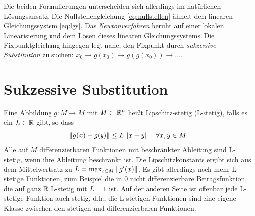 Die beiden Formulierungen unterscheiden sich allerdings im natürlichen
Lösungsansatz. Die Nullstellengleichung \eqref{eq:nullstellen} ähnelt
dem linearen Gleichungssystem \eqref{eq:lgs}. Das
\emph{Newtonverfahren} beruht auf einer lokalen Linearisierung und dem
Lösen dieses linearen Gleichungssystems. Die Fixpunktgleichung
hingegen legt nahe, den Fixpunkt durch \emph{sukzessive Substitution}
zu suchen: $x_0\to g(x_0)\to g(g(x_0))\to\ldots$.

\section{Sukzessive Substitution}

Eine Abbildung $g:M\to M$ mit $M\subset\mathbb{R}^n$ heißt Lipschitz-stetig
(L-stetig), falls es ein $L\in\mathbb{R}$ gibt, so dass
\begin{equation}
  \left\lVert{g(x) - g(y)}\right\rVert \le L \left\lVert{x - y}\right\rVert\quad\forall x,y\in M.
\end{equation}
Alle auf $M$ differenzierbaren Funktionen mit beschränkter Ableitung
sind L-stetig, wenn ihre Ableitung beschränkt ist. Die
Lipschitzkonstante ergibt sich aus dem Mittelwertsatz zu $L=\max_{x\in
  M}\left\lVert{g'(x)}\right\rVert$.  Es gibt allerdings noch mehr L-stetige Funktionen,
zum Beispiel die in 0 nicht differenzierbare Betragsfunktion, die auf
ganz $\mathbb{R}$ L-stetig mit $L = 1$ ist. Auf der anderen Seite ist
offenbar jede L-stetige Funktion auch stetig, d.h., die L-stetigen
Funktionen sind eine eigene Klasse zwischen den stetigen und
differenzierbaren Funktionen.

